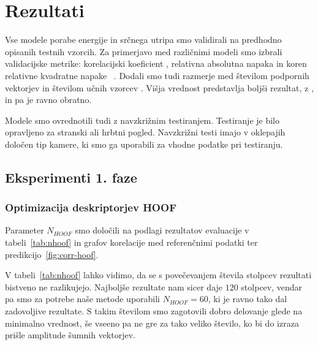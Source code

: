 \chapter{Rezultati}\label{sec:rezultati}
Vse modele porabe energije in srčnega utripa smo validirali na predhodno opisanih testnih vzorcih. Za primerjavo med različnimi modeli smo izbrali validacijske metrike: korelacijski koeficient \corr, relativna absolutna napaka \rae in koren relativne kvadratne napake \rrse~\cite{witten2005data}. Dodali smo tudi razmerje med številom podpornih vektorjev in številom učnih vzorcev \nsv. Višja vrednost \corr predstavlja boljši rezultat, z \rae, \rrse in \nsv pa je ravno obratno.

Modele smo ovrednotili tudi z navzkrižnim testiranjem. Testiranje je bilo opravljeno za stranski ali hrbtni pogled. Navzkrižni testi imajo v oklepajih določen tip kamere, ki smo ga uporabili za vhodne podatke pri testiranju.











\section{Eksperimenti 1. faze}


\subsection{Optimizacija deskriptorjev HOOF}\label{sec:rezultati-optimizacija-hoof}
Parameter $N_{HOOF}$ smo določili na podlagi rezultatov evaluacije v tabeli~\ref{tab:nhoof} in grafov korelacije med referenčnimi podatki ter predikcijo~\ref{fig:corr-hoof}.

V tabeli~\ref{tab:nhoof} lahko vidimo, da se s povečevanjem števila stolpcev rezultati bistveno ne razlikujejo. Najboljše rezultate nam sicer daje $120$ stolpcev, vendar pa smo za potrebe naše metode uporabili $N_{HOOF}=60$, ki je ravno tako dal zadovoljive rezultate. S takim številom smo zagotovili dobro delovanje glede na minimalno vrednost, še vseeno pa ne gre za tako veliko število, ko bi do izraza prišle amplitude šumnih vektorjev.

